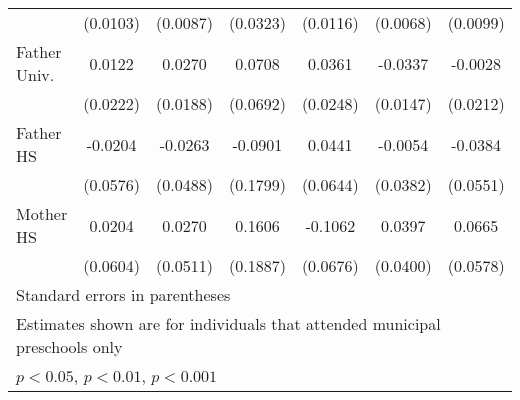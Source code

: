 \begin{table}[htbp]
\begin{tabular}{l*{6}{c}}
            &    (0.0103)         &    (0.0087)         &    (0.0323)         &    (0.0116)         &    (0.0068)         &    (0.0099)         \\
\addlinespace
Father Univ.&      0.0122         &      0.0270         &      0.0708         &      0.0361         &     -0.0337\sym{*}  &     -0.0028         \\
            &    (0.0222)         &    (0.0188)         &    (0.0692)         &    (0.0248)         &    (0.0147)         &    (0.0212)         \\
\addlinespace
Father HS   &     -0.0204         &     -0.0263         &     -0.0901         &      0.0441         &     -0.0054         &     -0.0384         \\
            &    (0.0576)         &    (0.0488)         &    (0.1799)         &    (0.0644)         &    (0.0382)         &    (0.0551)         \\
\addlinespace
Mother HS   &      0.0204         &      0.0270         &      0.1606         &     -0.1062         &      0.0397         &      0.0665         \\
            &    (0.0604)         &    (0.0511)         &    (0.1887)         &    (0.0676)         &    (0.0400)         &    (0.0578)         \\
\bottomrule
\multicolumn{7}{l}{\footnotesize Standard errors in parentheses}\\
\multicolumn{7}{l}{\footnotesize Estimates shown are for individuals that attended municipal preschools only}\\
\multicolumn{7}{l}{\footnotesize \sym{*} \(p<0.05\), \sym{**} \(p<0.01\), \sym{***} \(p<0.001\)}\\
\end{tabular}
\end{table}
